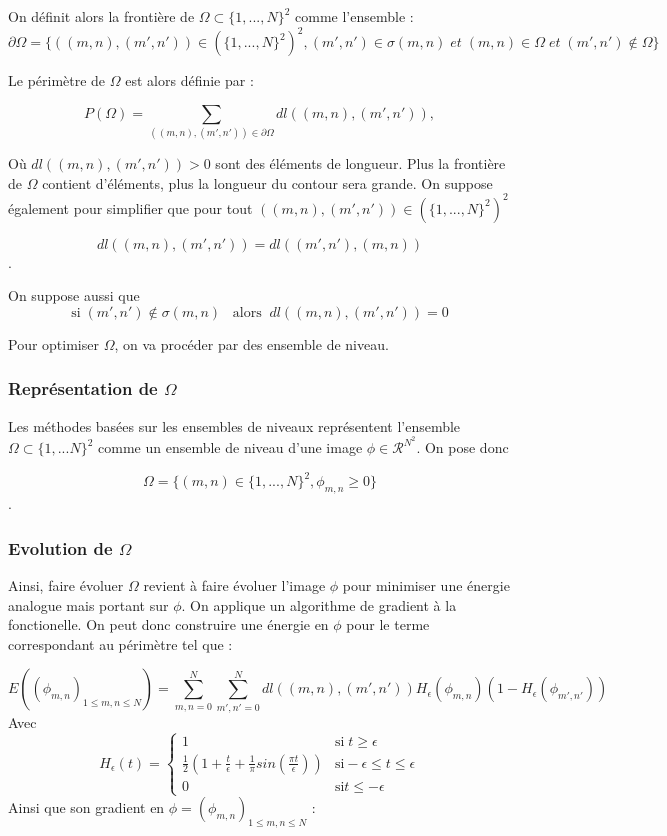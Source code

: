 On définit alors la frontière de $\Omega \subset \{ 1,...,N\}^2$ comme l'ensemble : 
\[ \partial \Omega = \{ ((m,n),(m',n')) \in (\{ 1,...,N\}^2)^2, (m',n') \in \sigma (m,n) \; et \; (m,n)\in \Omega \; et \; (m',n') \notin \Omega \}\] 

Le périmètre de $\Omega$ est alors définie par : 

\[ P(\Omega) = \sum \limits_{((m,n),(m',n')) \in \partial \Omega} dl((m,n),(m',n')),\] 

Où $ dl((m,n),(m',n')) > 0$ sont des éléments de longueur. Plus la frontière de $\Omega$ contient d'éléments, plus la longueur du contour sera grande. On suppose également pour simplifier que pour tout $((m,n), (m',n')) \in (\{ 1,...,N\}^2)^2$ 

\[ dl((m,n),(m',n')) = dl((m',n'),(m,n))\].

On suppose aussi que 
\[ \text{si} \; (m',n') \notin \sigma (m,n) \; \; \; \text{alors} \; \; dl((m,n),(m',n')) = 0\]

Pour optimiser $\Omega$, on va procéder par des ensemble de niveau. 
\subsubsection{Représentation de $\Omega$}
Les méthodes basées sur les ensembles de niveaux représentent l'ensemble $\Omega \subset \{1,...N\}^2$ comme un ensemble de niveau d'une image $\phi \in \mathcal{R}^{N^2}$. On pose donc 

\[ \Omega = \{ (m,n) \in \{1,...,N \}^2, \phi_{m,n} \geq 0 \} \].
\subsubsection{Evolution de $\Omega$}
Ainsi, faire évoluer $\Omega$ revient à faire évoluer l'image $\phi$ pour minimiser une énergie analogue mais portant sur $\phi$. On applique un algorithme de gradient à la fonctionelle. On peut donc construire une énergie en $\phi$  pour le terme correspondant au  périmètre tel que : 

\[ E ((\phi_{m,n})_{1 \leq m,n \leq N}) = \sum \limits_{m,n = 0}^N  \sum \limits_{m',n' = 0}^N  dl((m,n),(m',n')) H_{\epsilon} (\phi_{m,n}) ( 1 - H_{\epsilon}(\phi_{m',n'})) \] 
Avec 
\[ H_{\epsilon} (t) = \left\{ \begin{matrix}
1 & \text{si} \; t \geq \epsilon \\
\frac{1}{2} (1 + \frac{t}{\epsilon} + \frac{1}{\pi}sin(\frac{\pi t}{\epsilon})) & \text{si} -\epsilon \leq t \leq \epsilon \\
0 & \text{si} t \leq - \epsilon 
\end{matrix} \right. \] 
Ainsi que son gradient en $\phi = (\phi_{m,n})_{1 \leq m,n \leq N}$ : 

